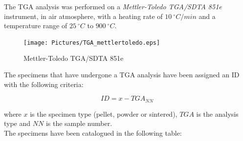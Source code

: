 \documentclass{article}
\begin{document}
            The TGA analysis was performed on a \textit{Mettler-Toledo TGA/SDTA 851e} \autocites{Mettler_Toledo} instrument, 
            in air atmosphere, with a heating rate of $10 \ ^{\circ}C/min$ and a temperature range of $25 \ ^{\circ}C$ to $900 \ ^{\circ}C$. \\

            \begin{figure}[h!]
                \centering
                \texttt{[image: Pictures/TGA\_mettlertoledo.eps]}
                \caption{Mettler-Toledo TGA/SDTA 851e \autocites{Mettler_Toledo}}
                \label{fig:TGA_mettlertoledo}
            \end{figure}

            The specimens that have undergone a TGA analysis have been assigned an ID with the following criteria:

                \begin{equation}
                    ID = x-TGA_{NN}
                    \label{eq:TGA_ID}
                \end{equation}

            where $x$ is the specimen type (pellet, powder or sintered), $TGA$ is the analysis type and $NN$ is the sample number. \\

            The specimens have been catalogued in the following table:

                    \begin{table}[h!]
                        \centering
                        \caption{TGA specimens}
                        \label{tab:TGA_specimens}
                    \end{table}
\end{document}
